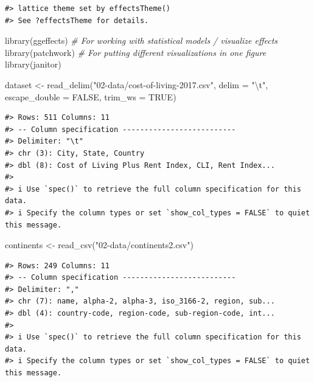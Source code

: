 \documentclass[
  11pt,
  a4paper,
  twoside]{scrbook}
\newenvironment{Shaded}{\begin{snugshade}}{\end{snugshade}}
\newcommand{\AttributeTok}[1]{\textcolor[rgb]{0.77,0.63,0.00}{#1}}
\newcommand{\CommentTok}[1]{\textcolor[rgb]{0.56,0.35,0.01}{\textit{#1}}}
\newcommand{\ConstantTok}[1]{\textcolor[rgb]{0.00,0.00,0.00}{#1}}
\newcommand{\FunctionTok}[1]{\textcolor[rgb]{0.00,0.00,0.00}{#1}}
\newcommand{\NormalTok}[1]{#1}
\newcommand{\OtherTok}[1]{\textcolor[rgb]{0.56,0.35,0.01}{#1}}
\newcommand{\SpecialCharTok}[1]{\textcolor[rgb]{0.00,0.00,0.00}{#1}}
\newcommand{\StringTok}[1]{\textcolor[rgb]{0.31,0.60,0.02}{#1}}
\begin{document}
\linespread{1}

\begin{verbatim}
#> lattice theme set by effectsTheme()
#> See ?effectsTheme for details.
\end{verbatim}

\linespread{1}

\begin{Shaded}
\begin{Highlighting}[]
\FunctionTok{library}\NormalTok{(ggeffects) }\CommentTok{\# For working with statistical models / visualize effects}
\FunctionTok{library}\NormalTok{(patchwork) }\CommentTok{\# For putting different visualizations in one figure}
\FunctionTok{library}\NormalTok{(janitor)}

\NormalTok{dataset }\OtherTok{\textless{}{-}} \FunctionTok{read\_delim}\NormalTok{(}\StringTok{"02{-}data/cost{-}of{-}living{-}2017.csv"}\NormalTok{, }
                      \AttributeTok{delim =} \StringTok{"}\SpecialCharTok{\textbackslash{}t}\StringTok{"}\NormalTok{, }\AttributeTok{escape\_double =} \ConstantTok{FALSE}\NormalTok{, }
                      \AttributeTok{trim\_ws =} \ConstantTok{TRUE}\NormalTok{)}
\end{Highlighting}
\end{Shaded}

\linespread{1}

\begin{verbatim}
#> Rows: 511 Columns: 11
#> -- Column specification --------------------------
#> Delimiter: "\t"
#> chr (3): City, State, Country
#> dbl (8): Cost of Living Plus Rent Index, CLI, Rent Index...
#> 
#> i Use `spec()` to retrieve the full column specification for this data.
#> i Specify the column types or set `show_col_types = FALSE` to quiet this message.
\end{verbatim}

\linespread{1}

\begin{Shaded}
\begin{Highlighting}[]
\NormalTok{continents }\OtherTok{\textless{}{-}} \FunctionTok{read\_csv}\NormalTok{(}\StringTok{"02{-}data/continents2.csv"}\NormalTok{)}
\end{Highlighting}
\end{Shaded}

\linespread{1}

\begin{verbatim}
#> Rows: 249 Columns: 11
#> -- Column specification --------------------------
#> Delimiter: ","
#> chr (7): name, alpha-2, alpha-3, iso_3166-2, region, sub...
#> dbl (4): country-code, region-code, sub-region-code, int...
#> 
#> i Use `spec()` to retrieve the full column specification for this data.
#> i Specify the column types or set `show_col_types = FALSE` to quiet this message.
\end{verbatim}
\end{document}
